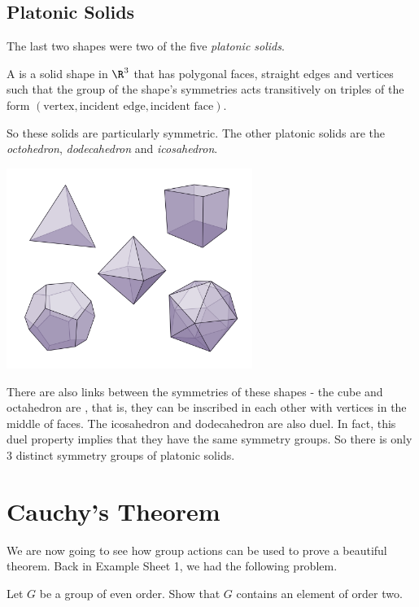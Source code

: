 \documentclass[a4]{scrreprt}
\begin{document}
\subsection{Platonic Solids}

The last two shapes were two of the five \emph{platonic solids}.

\begin{definition}
	A  is a solid shape in $\R^3$ that has polygonal faces, straight edges and vertices such that the group of the shape's symmetries acts transitively on triples of the form $(\text{vertex}, \text{incident edge}, \text{incident face})$.
\end{definition}
So these solids are particularly symmetric. The other platonic solids are the \emph{octohedron}, \emph{dodecahedron} and \emph{icosahedron}.
\begin{center}
	\includegraphics[width=0.6\textwidth]{platonic.png}
\end{center}

There are also links between the symmetries of these shapes - the cube and octahedron are , that is, they can be inscribed in each other with vertices in the middle of faces. The icosahedron and dodecahedron are also duel. In fact, this duel property implies that they have the same symmetry groups. So there is only 3 distinct symmetry groups of platonic solids.

\section{Cauchy's Theorem}

We are now going to see how group actions can be used to prove a beautiful theorem. Back in Example Sheet 1, we had the following problem.

\begin{problem*}
	Let $G$ be a group of even order. Show that $G$ contains an element of order two.
\end{problem*}
\end{document}
